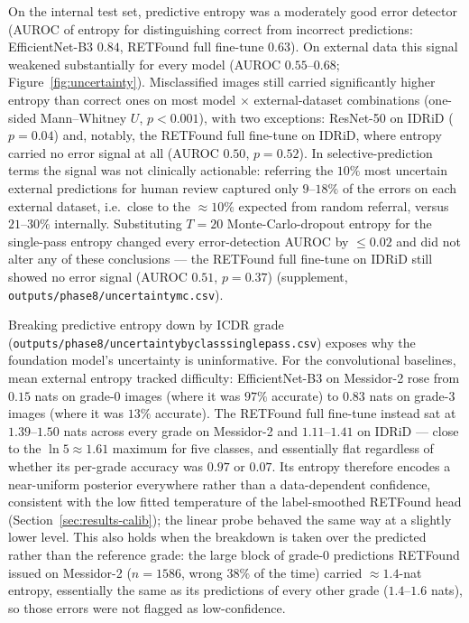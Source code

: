 \documentclass[journal]{IEEEtran}
\renewcommand{\_}{\origunderscore\allowbreak}
\begin{document}
On the internal test set, predictive entropy was a moderately good error detector
(AUROC of entropy for distinguishing correct from incorrect predictions:
EfficientNet-B3 $0.84$, RETFound full fine-tune $0.63$). On external data this
signal weakened substantially for every model (AUROC $0.55$--$0.68$;
Figure~\ref{fig:uncertainty}). Misclassified images still carried significantly
higher entropy than correct ones on most model $\times$ external-dataset
combinations (one-sided Mann--Whitney $U$, $p<0.001$), with two exceptions:
ResNet-50 on IDRiD ($p=0.04$) and, notably, the RETFound full fine-tune on IDRiD,
where entropy carried no error signal at all (AUROC $0.50$, $p=0.52$). In
selective-prediction terms the signal was not clinically actionable: referring
the $10\%$ most uncertain external predictions for human review captured only
$9$--$18\%$ of the errors on each external dataset, i.e.\ close to the
$\approx 10\%$ expected from random referral, versus $21$--$30\%$ internally.
Substituting $T=20$ Monte-Carlo-dropout entropy for the single-pass entropy
changed every error-detection AUROC by $\leq 0.02$ and did not alter any of these
conclusions --- the RETFound full fine-tune on IDRiD still showed no error signal
(AUROC $0.51$, $p=0.37$) (supplement,
\texttt{outputs/\allowbreak{}phase8/\allowbreak{}uncertainty\_mc.csv}).

Breaking predictive entropy down by ICDR grade
(\texttt{outputs/\allowbreak{}phase8/\allowbreak{}uncertainty\_by\_class\_singlepass.csv}) exposes why the
foundation model's uncertainty is uninformative. For the convolutional baselines,
mean external entropy tracked difficulty: EfficientNet-B3 on Messidor-2 rose from
$0.15$ nats on grade-0 images (where it was $97\%$ accurate) to $0.83$ nats on
grade-3 images (where it was $13\%$ accurate). The RETFound full fine-tune instead
sat at $1.39$--$1.50$ nats across every grade on Messidor-2 and $1.11$--$1.41$ on
IDRiD --- close to the $\ln 5 \approx 1.61$ maximum for five classes, and
essentially flat regardless of whether its per-grade accuracy was $0.97$ or
$0.07$. Its entropy therefore encodes a near-uniform posterior everywhere rather
than a data-dependent confidence, consistent with the low fitted temperature of
the label-smoothed RETFound head (Section~\ref{sec:results-calib}); the linear
probe behaved the same way at a slightly lower level. This also holds when the
breakdown is taken over the predicted rather than the reference grade: the large
block of grade-0 predictions RETFound issued on Messidor-2 ($n=1586$, wrong $38\%$
of the time) carried $\approx 1.4$-nat entropy, essentially the same as its
predictions of every other grade ($1.4$--$1.6$ nats), so those errors were not
flagged as low-confidence.
\end{document}

